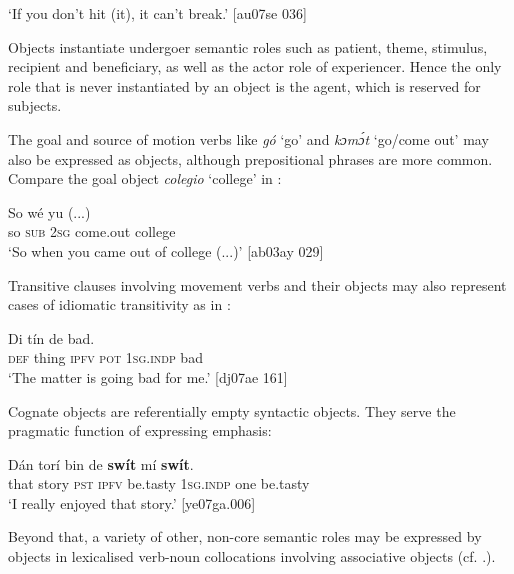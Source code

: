 \glt ‘If you don’t hit (it), it can’t break.’ [au07se 036]
\z

Objects instantiate undergoer semantic roles such as patient, theme, stimulus, recipient and beneficiary, as well as the actor role of experiencer. Hence the only role that is never instantiated by an object is the agent, which is reserved for subjects. 


The goal\is{} and source\index{} of motion verbs like \textit{gó} ‘go’ and \textit{kɔmɔ́t} ‘go/come out’ may also be expressed as objects, although prepositional phrases are more common. Compare the goal object \textit{colegio} ‘college’ in :



\ea%
    \label{ex:key:1048}
    \gll So  wé  yu        (...)\\
so  \textsc{sub}  \textsc{2sg}  come.out  college\\

\glt ‘So when you came out of college (...)’ [ab03ay 029]
\z

Transitive clauses involving movement verbs and their objects may also represent cases of idiomatic transitivity as in : 


\ea%
    \label{ex:key:1049}
    \gll Di  tín    de        bad.\\
\textsc{def}  thing  \textsc{ipfv}  \textsc{pot}  \textsc{1sg.indp}  bad\\

\glt ‘The matter is going bad for me.’ [dj07ae 161]
\z

Cognate objects are referentially empty syntactic objects. They serve the pragmatic function of expressing emphasis: 


\ea%
    \label{ex:key:1050}
    \gll Dán    torí    bin  de  \textbf{swít}    mí        \textbf{swít}.\\
that    story  \textsc{pst}  \textsc{ipfv}  be.tasty  \textsc{1sg.indp}  one    be.tasty\\

\glt ‘I really enjoyed that story.’ [ye07ga.006]
\z

Beyond that, a variety of other, non-core semantic roles may be expressed by objects in lexicalised verb-noun collocations involving associative objects (cf. .). 

